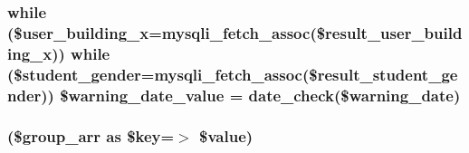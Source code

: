 \hypertarget{index_8php_a3d1961773bdbdee0e00ae0f8ff9d3aa5}{
\subsubsection[{\$warning\-\_\-date\-\_\-value}]{\setlength{\rightskip}{0pt plus 5cm}while (\$user\-\_\-building\-\_\-x=mysqli\-\_\-fetch\-\_\-assoc(\$result\-\_\-user\-\_\-building\-\_\-x)) while (\$student\-\_\-gender=mysqli\-\_\-fetch\-\_\-assoc(\$result\-\_\-student\-\_\-gender)) \$warning\-\_\-date\-\_\-value = {\bf date\-\_\-check}(\$warning\-\_\-date)}}\label{index_8php_a3d1961773bdbdee0e00ae0f8ff9d3aa5}
\hypertarget{index_8php_ae8a8513d0c829bc40172efcee07e4b8f}{
\subsubsection[{foreach}]{(\$group\-\_\-arr as \$key=$>$ \$value)}}\label{index_8php_ae8a8513d0c829bc40172efcee07e4b8f}
